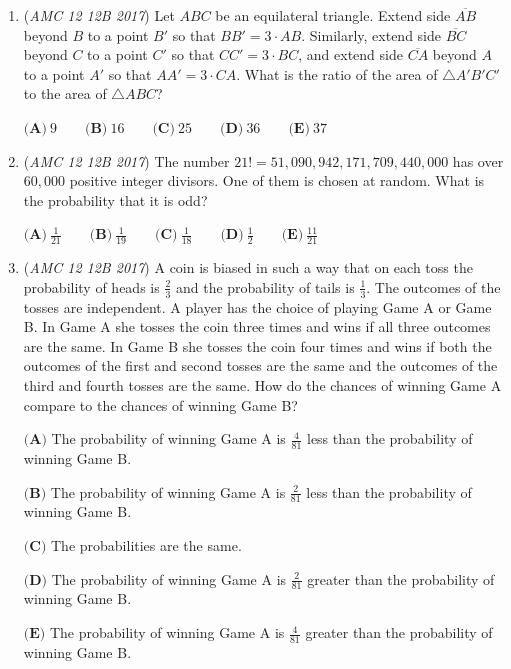 \begin{enumerate}
 $\textbf{(A)}\ 8\pi \qquad \textbf{(B)}\ \frac{28\pi}{3} \qquad \textbf{(C)}\ 12\pi \qquad \textbf{(D)}\ 14\pi \qquad \textbf{(E)}\ \frac{44\pi}{3}$


	\item (\textit{AMC 12 12B 2017}) Let $ABC$ be an equilateral triangle. Extend side $\overline{AB}$ beyond $B$ to a point $B'$ so that $BB'=3 \cdot AB$. Similarly, extend side $\overline{BC}$ beyond $C$ to a point $C'$ so that $CC'=3 \cdot BC$, and extend side $\overline{CA}$ beyond $A$ to a point $A'$ so that $AA'=3 \cdot CA$. What is the ratio of the area of $\triangle A'B'C'$ to the area of $\triangle ABC$?


 $\textbf{(A)}\ 9\qquad\textbf{(B)}\ 16\qquad\textbf{(C)}\ 25\qquad\textbf{(D)}\ 36\qquad\textbf{(E)}\ 37$


	\item (\textit{AMC 12 12B 2017}) The number $21!=51,090,942,171,709,440,000$ has over $60,000$ positive integer divisors. One of them is chosen at random. What is the probability that it is odd?


 $\textbf{(A)}\ \frac{1}{21} \qquad \textbf{(B)}\ \frac{1}{19} \qquad \textbf{(C)}\ \frac{1}{18} \qquad \textbf{(D)}\ \frac{1}{2} \qquad \textbf{(E)}\ \frac{11}{21}$


	\item (\textit{AMC 12 12B 2017}) A coin is biased in such a way that on each toss the probability of heads is $\frac{2}{3}$ and the probability of tails is $\frac{1}{3}$. The outcomes of the tosses are independent. A player has the choice of playing Game A or Game B. In Game A she tosses the coin three times and wins if all three outcomes are the same. In Game B she tosses the coin four times and wins if both the outcomes of the first and second tosses are the same and the outcomes of the third and fourth tosses are the same. How do the chances of winning Game A compare to the chances of winning Game B?


 $\textbf{(A)}$ The probability of winning Game A is $\frac{4}{81}$ less than the probability of winning Game B.


 $\textbf{(B)}$ The probability of winning Game A is $\frac{2}{81}$ less than the probability of winning Game B.


 $\textbf{(C)}$ The probabilities are the same.


 $\textbf{(D)}$ The probability of winning Game A is $\frac{2}{81}$ greater than the probability of winning Game B.


 $\textbf{(E)}$ The probability of winning Game A is $\frac{4}{81}$ greater than the probability of winning Game B.



\end{enumerate}
